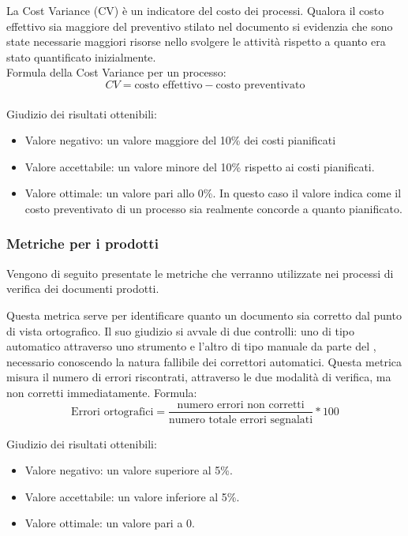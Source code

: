 \documentclass[a4paper, titlepage]{article}
\begin{document}
\label{par:CV}
La Cost Variance (CV) è un indicatore del costo dei processi. Qualora il costo effettivo sia maggiore del preventivo stilato nel documento  si evidenzia che sono state necessarie maggiori risorse nello svolgere le attività rispetto a quanto era stato quantificato inizialmente.
\\Formula della Cost Variance per un processo:
\begin{displaymath}
CV= \mbox{costo effettivo} - \mbox{costo preventivato}
\end{displaymath}
\\ Giudizio dei risultati ottenibili:
\begin{itemize}
\item Valore negativo: un valore maggiore del 10\% dei costi pianificati
\item Valore accettabile: un valore minore del 10\% rispetto ai costi pianificati.
\item Valore ottimale: un valore pari allo 0\%. In questo caso il valore indica come il costo preventivato di un processo sia realmente concorde a quanto pianificato. 
\end{itemize}


\subsubsection{Metriche per i prodotti}

Vengono di seguito presentate le metriche che verranno utilizzate nei processi di verifica dei documenti prodotti.

\label{par:errort}
Questa metrica serve per identificare quanto un documento sia corretto dal punto di vista ortografico. Il suo giudizio si avvale di due controlli: uno di tipo automatico attraverso uno strumento  e l'altro di tipo manuale da parte del , necessario conoscendo la natura fallibile dei correttori automatici.
\newline Questa metrica misura il numero di errori riscontrati, attraverso le due modalità di verifica, ma non corretti immediatamente.
\newline Formula:
\begin{displaymath}
\mbox{Errori ortografici}= \frac{\mbox{numero errori non corretti}}{\mbox{numero totale errori segnalati}}*100
\end{displaymath}
\par Giudizio dei risultati ottenibili:
\begin{itemize}
\item Valore negativo: un valore superiore al 5\%. 
\item Valore accettabile: un valore inferiore al 5\%.
\item Valore ottimale: un valore pari a 0.
\end{itemize}
\end{document}
